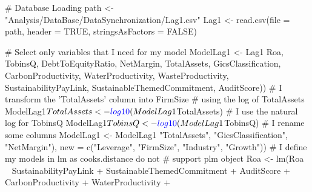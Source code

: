 \documentclass[12pt,]{article}
\newenvironment{Shaded}{}{}
\newcommand{\KeywordTok}[1]{\textcolor[rgb]{0.00,0.00,1.00}{#1}}
\newcommand{\DataTypeTok}[1]{#1}
\newcommand{\StringTok}[1]{\textcolor[rgb]{0.00,0.50,0.50}{#1}}
\newcommand{\CommentTok}[1]{\textcolor[rgb]{0.00,0.50,0.00}{#1}}
\newcommand{\OtherTok}[1]{\textcolor[rgb]{1.00,0.25,0.00}{#1}}
\newcommand{\OperatorTok}[1]{#1}
\newcommand{\NormalTok}[1]{#1}
\begin{document}
\begin{Shaded}
\begin{Highlighting}[]
\CommentTok{# Database Loading}
\NormalTok{path <-}\StringTok{ "Analysis/DataBase/DataSynchronization/Lag1.csv"}
\NormalTok{Lag1 <-}\StringTok{ }\KeywordTok{read.csv}\NormalTok{(}\DataTypeTok{file =}\NormalTok{ path, }\DataTypeTok{header =} \OtherTok{TRUE}\NormalTok{, }\DataTypeTok{stringsAsFactors =} \OtherTok{FALSE}\NormalTok{)}
\end{Highlighting}
\end{Shaded}

\begin{Shaded}
\begin{Highlighting}[]
\CommentTok{# Select only variables that I need for my model}
\NormalTok{ModelLag1 <-}\StringTok{ }\NormalTok{Lag1 }\OperatorTok{%
\NormalTok{    Roa, TobinsQ, DebtToEquityRatio, NetMargin, TotalAssets, }
\NormalTok{    GicsClassification, CarbonProductivity, WaterProductivity, }
\NormalTok{    WasteProductivity, SustainabilityPayLink, SustainableThemedCommitment, }
\NormalTok{    AuditScore))}
\CommentTok{# I transform the 'TotalAssets' column into FirmSize}
\CommentTok{# using the log of TotalAssets}
\NormalTok{ModelLag1}\OperatorTok{$}\NormalTok{TotalAssets <-}\StringTok{ }\KeywordTok{log10}\NormalTok{(ModelLag1}\OperatorTok{$}\NormalTok{TotalAssets)}
\CommentTok{# I use the natural log for TobinsQ}
\NormalTok{ModelLag1}\OperatorTok{$}\NormalTok{TobinsQ <-}\StringTok{ }\KeywordTok{log10}\NormalTok{(ModelLag1}\OperatorTok{$}\NormalTok{TobinsQ)}
\CommentTok{# I rename some columns}
\NormalTok{ModelLag1 <-}\StringTok{ }\NormalTok{ModelLag1 }\OperatorTok{%
    \StringTok{"TotalAssets"}\NormalTok{, }\StringTok{"GicsClassification"}\NormalTok{, }\StringTok{"NetMargin"}\NormalTok{), }\DataTypeTok{new =} \KeywordTok{c}\NormalTok{(}\StringTok{"Leverage"}\NormalTok{, }
    \StringTok{"FirmSize"}\NormalTok{, }\StringTok{"Industry"}\NormalTok{, }\StringTok{"Growth"}\NormalTok{))}
\CommentTok{# I define my models in lm as cooks.distance do not}
\CommentTok{# support plm object}
\NormalTok{Roa <-}\StringTok{ }\KeywordTok{lm}\NormalTok{(Roa }\OperatorTok{~}\StringTok{ }\NormalTok{SustainabilityPayLink }\OperatorTok{+}\StringTok{ }\NormalTok{SustainableThemedCommitment }\OperatorTok{+}\StringTok{ }
\StringTok{    }\NormalTok{AuditScore }\OperatorTok{+}\StringTok{ }\NormalTok{CarbonProductivity }\OperatorTok{+}\StringTok{ }\NormalTok{WaterProductivity }\OperatorTok{+}\StringTok{ }
}}
\end{Highlighting}
\end{Shaded}
\end{document}
